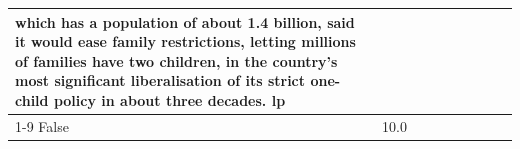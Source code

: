 \begin{table}[H]
\begin{tabular}{lllrlllll}
which has a population of about 1.4 billion, said it would ease family restrictions, letting millions of families have two children, in the country's most significant liberalisation of its strict one-child policy in about three decades. lp \\
\cline{1-9}
False & 10.0%
\end{tabular}
\end{table}
